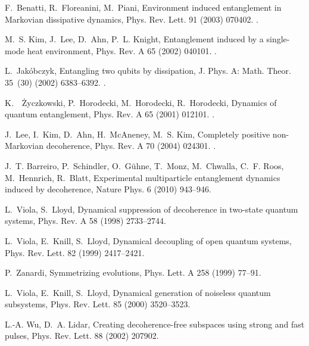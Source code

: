 \documentclass[3p,sort&compress,12pt]{elsarticle}
\begin{document}
\begin{thebibliography}{100}
F.~Benatti, R.~Floreanini, M.~Piani, Environment induced entanglement in
  {M}arkovian dissipative dynamics, Phys. Rev. Lett. 91 (2003) 070402.
\newblock \href {http://dx.doi.org/10.1103/PhysRevLett.91.070402}
  {}.

M.~S. Kim, J.~Lee, D.~Ahn, P.~L. Knight, Entanglement induced by a single-mode
  heat environment, Phys. Rev. A 65 (2002) 040101.
\newblock \href {http://dx.doi.org/10.1103/PhysRevA.65.040101}
  {}.

L.~Jak{\'o}bczyk, Entangling two qubits by
  dissipation, J. Phys. A: Math. Theor. 35~(30) (2002) 6383--6392.
\newblock \href {http://dx.doi.org/10.1088/0305-4470/35/30/313}
  {}.

K.~\ifmmode~\else \.{Z}\fi{}yczkowski, P.~Horodecki, M.~Horodecki,
  R.~Horodecki, Dynamics of quantum entanglement, Phys. Rev. A 65 (2001)
  012101.
\newblock \href {http://dx.doi.org/10.1103/PhysRevA.65.012101}
  {}.

J.~Lee, I.~Kim, D.~Ahn, H.~McAneney, M.~S. Kim, Completely positive
  non-{M}arkovian decoherence, Phys. Rev. A 70 (2004) 024301.
\newblock \href {http://dx.doi.org/10.1103/PhysRevA.70.024301}
  {}.

J.~T. Barreiro, P.~Schindler, O.~G{\"u}hne, T.~Monz, M.~Chwalla, C.~F. Roos,
  M.~Hennrich, R.~Blatt, Experimental multiparticle entanglement dynamics
  induced by decoherence, Nature Phys. 6 (2010) 943--946.

L.~Viola, S.~Lloyd, Dynamical suppression of decoherence in two-state quantum
  systems, Phys. Rev. A 58 (1998) 2733--2744.

L.~Viola, E.~Knill, S.~Lloyd, Dynamical decoupling of open quantum systems,
  Phys. Rev. Lett. 82 (1999) 2417--2421.

P.~Zanardi, Symmetrizing evolutions, Phys. Lett. A 258 (1999) 77--91.

L.~Viola, E.~Knill, S.~Lloyd, Dynamical generation of noiseless quantum
  subsystems, Phys. Rev. Lett. 85 (2000) 3520--3523.

L.-A. Wu, D.~A. Lidar, Creating decoherence-free subspaces using strong and
  fast pulses, Phys. Rev. Lett. 88 (2002) 207902.


\end{thebibliography}
\end{document}
